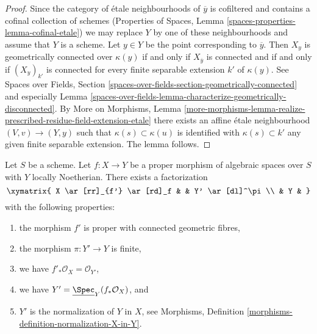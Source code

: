 \begin{proof}
Since the category of \'etale neighbourhoods of $\overline{y}$ is
cofiltered and contains a cofinal collection of schemes
(Properties of Spaces, Lemma \ref{spaces-properties-lemma-cofinal-etale})
we may replace $Y$ by one of these neighbourhoods and assume that
$Y$ is a scheme. Let $y \in Y$ be the point corresponding to $\overline{y}$.
Then $X_y$ is geometrically connected over $\kappa(y)$ if and only if
$X_{\overline{y}}$ is connected and if and only if $(X_y)_{k'}$
is connected for every finite separable extension $k'$ of $\kappa(y)$.
See Spaces over Fields, Section
\ref{spaces-over-fields-section-geometrically-connected} and especially
Lemma \ref{spaces-over-fields-lemma-characterize-geometrically-disconnected}.
By More on Morphisms, Lemma
\ref{more-morphisms-lemma-realize-prescribed-residue-field-extension-etale}
there exists an affine \'etale neighbourhood $(V, v) \to (Y, y)$ such that
$\kappa(s) \subset \kappa(u)$ is identified with $\kappa(s) \subset k'$
any given finite separable extension. The lemma follows.
\end{proof}

\begin{theorem}
\label{theorem-stein-factorization-Noetherian}
Let $S$ be a scheme. Let $f : X \to Y$ be a proper morphism of algebraic
spaces over $S$ with $Y$ locally Noetherian.
There exists a factorization
$$
\xymatrix{
X \ar[rr]_{f'} \ar[rd]_f & & Y' \ar[dl]^\pi \\
& Y &
}
$$
with the following properties:
\begin{enumerate}
\item the morphism $f'$ is proper with connected geometric fibres,
\item the morphism $\pi : Y' \to Y$ is finite,
\item we have $f'_*\mathcal{O}_X = \mathcal{O}_{Y'}$,
\item we have $Y' = \underline{\Spec}_Y(f_*\mathcal{O}_X)$, and
\item $Y'$ is the normalization of $Y$ in $X$, see
Morphisms, Definition \ref{morphisms-definition-normalization-X-in-Y}.
\end{enumerate}
\end{theorem}

